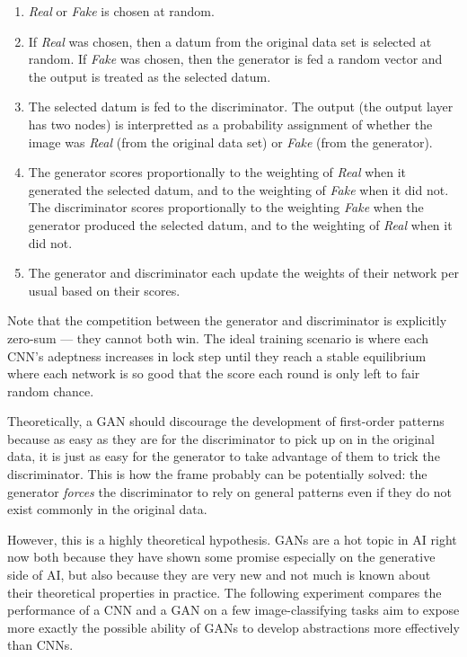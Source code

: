 \documentclass{article}
\renewcommand{\it}{\textit}
\begin{document}
\begin{enumerate}
\item
\it{Real} or \it{Fake} is chosen at random.
\item
If \it{Real} was chosen, then a datum from the original data set is selected at random.
If \it{Fake} was chosen, then the generator is fed a random vector and the output is treated as the selected datum.
\item
The selected datum is fed to the discriminator.
The output (the output layer has two nodes) is interpretted as a probability assignment of whether the image was \it{Real} (from the original data set) or \it{Fake} (from the generator).
\item
The generator scores proportionally to the weighting of \it{Real} when it generated the selected datum, and to the weighting of \it{Fake} when it did not.
The discriminator scores proportionally to the weighting \it{Fake} when the generator produced the selected datum, and  to the weighting of \it{Real} when it did not.
\item
The generator and discriminator each update the weights of their network per usual based on their scores.
\end{enumerate}
Note that the competition between the generator and discriminator is explicitly zero-sum --- they cannot both win. The ideal training scenario is where each CNN's adeptness increases in lock step until they reach a stable equilibrium where each network is so good that the score each round is only left to fair random chance.

Theoretically, a GAN should discourage the development of first-order patterns because as easy as they are for the discriminator to pick up on in the original data, it is just as easy for the generator to take advantage of them to trick the discriminator.
This is how the frame probably can be potentially solved: the generator \it{forces} the discriminator to rely on general patterns even if they do not exist commonly in the original data.

However, this is a highly theoretical hypothesis. GANs are a hot topic in AI right now both because they have shown some promise especially on the generative side of AI, but also because they are very new and not much is known about their theoretical properties in practice.
The following experiment compares the performance of a CNN and a GAN on a few image-classifying tasks aim to expose more exactly the possible ability of GANs to develop abstractions more effectively than CNNs.
\end{document}
